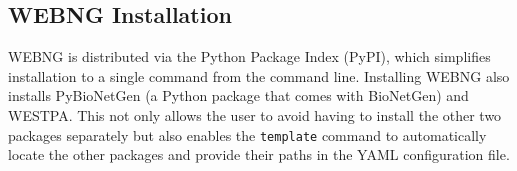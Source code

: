 \documentclass[10pt,letterpaper]{article}
\begin{document}

\subsection*{WEBNG Installation}

WEBNG is distributed via the Python Package Index (PyPI), which simplifies installation to a single command from the command line. Installing WEBNG also installs PyBioNetGen (a Python package that comes with BioNetGen) and WESTPA. This not only allows the user to avoid having to install the other two packages separately but also enables the \texttt{template} command to automatically locate the other packages and provide their paths in the YAML configuration file.

\end{document}
